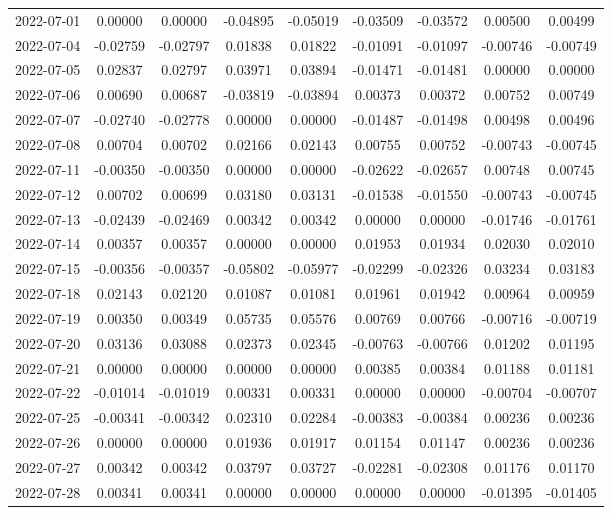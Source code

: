 \begin{footnotesize}
\begin{longtable}{lcccccccc}
2022-07-01 & 0.00000 & 0.00000 & -0.04895 & -0.05019 & -0.03509 & -0.03572 & 0.00500 & 0.00499 \\
2022-07-04 & -0.02759 & -0.02797 & 0.01838 & 0.01822 & -0.01091 & -0.01097 & -0.00746 & -0.00749 \\
2022-07-05 & 0.02837 & 0.02797 & 0.03971 & 0.03894 & -0.01471 & -0.01481 & 0.00000 & 0.00000 \\
2022-07-06 & 0.00690 & 0.00687 & -0.03819 & -0.03894 & 0.00373 & 0.00372 & 0.00752 & 0.00749 \\
2022-07-07 & -0.02740 & -0.02778 & 0.00000 & 0.00000 & -0.01487 & -0.01498 & 0.00498 & 0.00496 \\
2022-07-08 & 0.00704 & 0.00702 & 0.02166 & 0.02143 & 0.00755 & 0.00752 & -0.00743 & -0.00745 \\
2022-07-11 & -0.00350 & -0.00350 & 0.00000 & 0.00000 & -0.02622 & -0.02657 & 0.00748 & 0.00745 \\
2022-07-12 & 0.00702 & 0.00699 & 0.03180 & 0.03131 & -0.01538 & -0.01550 & -0.00743 & -0.00745 \\
2022-07-13 & -0.02439 & -0.02469 & 0.00342 & 0.00342 & 0.00000 & 0.00000 & -0.01746 & -0.01761 \\
2022-07-14 & 0.00357 & 0.00357 & 0.00000 & 0.00000 & 0.01953 & 0.01934 & 0.02030 & 0.02010 \\
2022-07-15 & -0.00356 & -0.00357 & -0.05802 & -0.05977 & -0.02299 & -0.02326 & 0.03234 & 0.03183 \\
2022-07-18 & 0.02143 & 0.02120 & 0.01087 & 0.01081 & 0.01961 & 0.01942 & 0.00964 & 0.00959 \\
2022-07-19 & 0.00350 & 0.00349 & 0.05735 & 0.05576 & 0.00769 & 0.00766 & -0.00716 & -0.00719 \\
2022-07-20 & 0.03136 & 0.03088 & 0.02373 & 0.02345 & -0.00763 & -0.00766 & 0.01202 & 0.01195 \\
2022-07-21 & 0.00000 & 0.00000 & 0.00000 & 0.00000 & 0.00385 & 0.00384 & 0.01188 & 0.01181 \\
2022-07-22 & -0.01014 & -0.01019 & 0.00331 & 0.00331 & 0.00000 & 0.00000 & -0.00704 & -0.00707 \\
2022-07-25 & -0.00341 & -0.00342 & 0.02310 & 0.02284 & -0.00383 & -0.00384 & 0.00236 & 0.00236 \\
2022-07-26 & 0.00000 & 0.00000 & 0.01936 & 0.01917 & 0.01154 & 0.01147 & 0.00236 & 0.00236 \\
2022-07-27 & 0.00342 & 0.00342 & 0.03797 & 0.03727 & -0.02281 & -0.02308 & 0.01176 & 0.01170 \\
2022-07-28 & 0.00341 & 0.00341 & 0.00000 & 0.00000 & 0.00000 & 0.00000 & -0.01395 & -0.01405 \\

\end{longtable}
\end{footnotesize}
